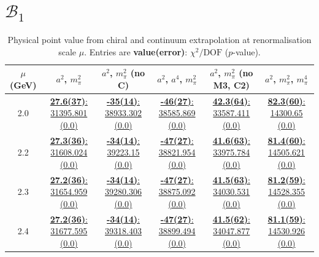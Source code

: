\documentclass[12pt]{extarticle}
\begin{document}
\section{$\mathcal{B}_1$}
\begin{table}[h!]
\begin{center}
\begin{tabular}{|c|c|c|c|c|c|}
\hline
$\mu$ (GeV) & $a^2$, $m_\pi^2$& $a^2$, $m_\pi^2$ (no C)& $a^2$, $a^4$, $m_\pi^2$& $a^2$, $m_\pi^2$ (no M3, C2)& $a^2$, $m_\pi^2$, $m_\pi^4$\\
\hline
2.0& \hyperlink{VVpAA/NPR/a2m2_20.pdf.1}{\textbf{27.6(37)}: 31395.801 (0.0)} & \hyperlink{VVpAA/NPR/a2m2noC_20.pdf.1}{\textbf{-35(14)}: 38933.302 (0.0)} & \hyperlink{VVpAA/NPR/a2a4m2_20.pdf.1}{\textbf{-46(27)}: 38585.869 (0.0)} & \hyperlink{VVpAA/NPR/a2m2mcut_20.pdf.1}{\textbf{42.3(64)}: 33587.411 (0.0)} & \hyperlink{VVpAA/NPR/a2m2m4_20.pdf.1}{\textbf{82.3(60)}: 14300.65 (0.0)}\\
2.2& \hyperlink{VVpAA/NPR/a2m2_22.pdf.1}{\textbf{27.3(36)}: 31608.024 (0.0)} & \hyperlink{VVpAA/NPR/a2m2noC_22.pdf.1}{\textbf{-34(14)}: 39223.15 (0.0)} & \hyperlink{VVpAA/NPR/a2a4m2_22.pdf.1}{\textbf{-47(27)}: 38821.954 (0.0)} & \hyperlink{VVpAA/NPR/a2m2mcut_22.pdf.1}{\textbf{41.6(63)}: 33975.784 (0.0)} & \hyperlink{VVpAA/NPR/a2m2m4_22.pdf.1}{\textbf{81.4(60)}: 14505.621 (0.0)}\\
2.3& \hyperlink{VVpAA/NPR/a2m2_23.pdf.1}{\textbf{27.2(36)}: 31654.959 (0.0)} & \hyperlink{VVpAA/NPR/a2m2noC_23.pdf.1}{\textbf{-34(14)}: 39280.306 (0.0)} & \hyperlink{VVpAA/NPR/a2a4m2_23.pdf.1}{\textbf{-47(27)}: 38875.092 (0.0)} & \hyperlink{VVpAA/NPR/a2m2mcut_23.pdf.1}{\textbf{41.5(63)}: 34030.531 (0.0)} & \hyperlink{VVpAA/NPR/a2m2m4_23.pdf.1}{\textbf{81.2(59)}: 14528.355 (0.0)}\\
2.4& \hyperlink{VVpAA/NPR/a2m2_24.pdf.1}{\textbf{27.2(36)}: 31677.595 (0.0)} & \hyperlink{VVpAA/NPR/a2m2noC_24.pdf.1}{\textbf{-34(14)}: 39318.403 (0.0)} & \hyperlink{VVpAA/NPR/a2a4m2_24.pdf.1}{\textbf{-47(27)}: 38899.494 (0.0)} & \hyperlink{VVpAA/NPR/a2m2mcut_24.pdf.1}{\textbf{41.5(62)}: 34047.877 (0.0)} & \hyperlink{VVpAA/NPR/a2m2m4_24.pdf.1}{\textbf{81.1(59)}: 14530.926 (0.0)}\\
\hline
\end{tabular}
\caption{Physical point value from chiral and continuum extrapolation at renormalisation scale $\mu$. Entries are \textbf{value(error)}: $\chi^2/\text{DOF}$ ($p$-value).}
\end{center}
\end{table}
\end{document}
